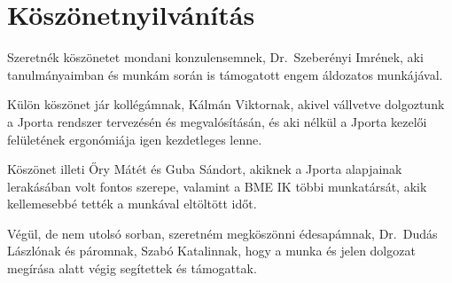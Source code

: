 \chapter*{Köszönetnyilvánítás}

Szeretnék köszönetet mondani konzulensemnek, Dr.~Szeberényi Imrének, aki tanulmányaimban és munkám során is támogatott engem áldozatos munkájával.

Külön köszönet jár kollégámnak, Kálmán Viktornak, akivel vállvetve dolgoztunk a Jporta rendszer tervezésén és megvalósításán, és aki nélkül a Jporta kezelői felületének ergonómiája igen kezdetleges lenne.

Köszönet illeti Őry Mátét és Guba Sándort, akiknek a Jporta alapjainak lerakásában volt fontos szerepe, valamint a BME IK többi munkatársát, akik kellemesebbé tették a munkával eltöltött időt.

Végül, de nem utolsó sorban, szeretném megköszönni édesapámnak, Dr.~Dudás Lászlónak és páromnak, Szabó Katalinnak, hogy a munka és jelen dolgozat megírása alatt végig segítettek és támogattak. 